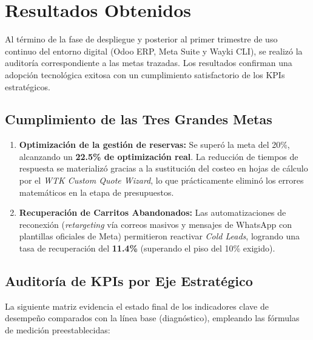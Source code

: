 \section{Resultados Obtenidos}

Al término de la fase de despliegue y posterior al primer trimestre de uso continuo del entorno digital (Odoo ERP, Meta Suite y Wayki CLI), se realizó la auditoría correspondiente a las metas trazadas. Los resultados confirman una adopción tecnológica exitosa con un cumplimiento satisfactorio de los KPIs estratégicos.

\subsection{Cumplimiento de las Tres Grandes Metas}

\begin{enumerate}
    \item \textbf{Optimización de la gestión de reservas:} Se superó la meta del 20\%, alcanzando un \textbf{22.5\% de optimización real}. La reducción de tiempos de respuesta se materializó gracias a la sustitución del costeo en hojas de cálculo por el \textit{WTK Custom Quote Wizard}, lo que prácticamente eliminó los errores matemáticos en la etapa de presupuestos.
    \item \textbf{Recuperación de Carritos Abandonados:} Las automatizaciones de reconexión (\textit{retargeting} vía correos masivos y mensajes de WhatsApp con plantillas oficiales de Meta) permitieron reactivar \textit{Cold Leads}, logrando una tasa de recuperación del \textbf{11.4\%} (superando el piso del 10\% exigido).
\end{enumerate}

\subsection{Auditoría de KPIs por Eje Estratégico}

La siguiente matriz evidencia el estado final de los indicadores clave de desempeño comparados con la línea base (diagnóstico), empleando las fórmulas de medición preestablecidas:

